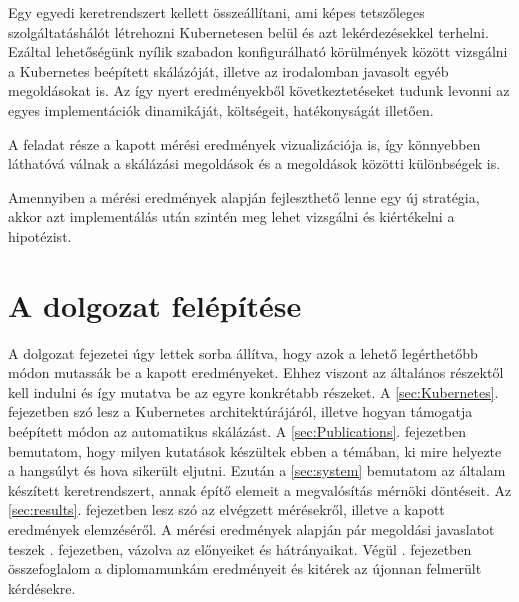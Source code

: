 Egy egyedi keretrendszert kellett összeállítani, ami képes tetszőleges szolgáltatáshálót létrehozni
Kubernetesen belül és azt lekérdezésekkel terhelni. Ezáltal lehetőségünk nyílik szabadon
konfigurálható körülmények között vizsgálni a Kubernetes beépített skálázóját, illetve az
irodalomban javasolt egyéb megoldásokat is. Az így nyert eredményekből következtetéseket tudunk
levonni az egyes implementációk dinamikáját, költségeit, hatékonyságát illetően.

A feladat része a kapott mérési eredmények vizualizációja is, így könnyebben láthatóvá válnak a
skálázási megoldások és a megoldások közötti különbségek is. 

Amennyiben a mérési eredmények alapján fejleszthető lenne egy új stratégia, akkor azt implementálás
után szintén meg lehet vizsgálni és kiértékelni a hipotézist.



\section{A dolgozat felépítése}
A dolgozat fejezetei úgy lettek sorba állítva, hogy azok a lehető legérthetőbb módon mutassák be a kapott eredményeket. Ehhez viszont az általános részektől kell indulni és így mutatva be az egyre konkrétabb részeket. 
A \ref{sec:Kubernetes}. fejezetben szó lesz a Kubernetes architektúrájáról, illetve hogyan támogatja beépített módon az automatikus skálázást. 
A \ref{sec:Publications}. fejezetben bemutatom, hogy milyen kutatások készültek ebben a témában, ki mire helyezte a hangsúlyt és hova sikerült eljutni.
Ezután a \ref{sec:system} bemutatom az általam készített keretrendszert, annak építő elemeit a megvalósítás mérnöki döntéseit. 
Az \ref{sec:results}. fejezetben lesz szó az elvégzett mérésekről, illetve a kapott eredmények elemzéséről.
A mérési eredmények alapján pár megoldási javaslatot teszek . fejezetben, vázolva az előnyeiket és hátrányaikat. 
Végül . fejezetben összefoglalom a diplomamunkám eredményeit és kitérek az újonnan felmerült kérdésekre.
